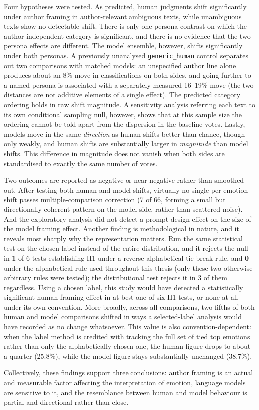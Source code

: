 Four hypotheses were tested. As predicted, human judgments shift significantly under
author framing in author-relevant ambiguous texts, while unambiguous texts show no detectable
shift. There is only one persona contrast on which the author-independent category is significant,
and there is no evidence that the two persona effects are different. The model ensemble, however,
shifts significantly under both personas. A previously unanalysed \texttt{generic\_human} control
separates
out two comparisons with matched models: an unspecified author line alone produces about an
8\% move in classifications on both sides, and going further to a named persona is associated
with a separately measured 16--19\% move (the two distances are not additive elements of a single
effect). The predicted category ordering holds in raw shift magnitude. A sensitivity analysis
referring each text to its own conditional sampling null, however, shows that at this sample size
the ordering cannot be told apart from the dispersion in the baseline votes. Lastly, models move
in the same \emph{direction} as human shifts better than chance, though only weakly, and human
shifts are substantially larger in \emph{magnitude} than model shifts. This difference in
magnitude does not vanish when both sides are standardised to exactly the same number of votes.

Two outcomes are reported as negative or near-negative rather than smoothed out. After testing
both human and model shifts, virtually no single per-emotion shift passes multiple-comparison
correction (7 of 66, forming a small but directionally coherent pattern on the model side, rather
than scattered noise). And the exploratory analysis did not detect a prompt-design effect on the size of the
model framing effect. Another finding is methodological in nature, and it reveals most sharply
why the representation matters. Run the same statistical test on the chosen label instead of the
entire distribution, and it rejects the null in \textbf{1} of 6 tests establishing H1 under a
reverse-alphabetical tie-break rule, and \textbf{0} under the alphabetical rule used throughout
this thesis (only these two otherwise-arbitrary rules were tested); the distributional test
rejects it in 3 of them regardless. Using a chosen label, this study would have detected a
statistically significant human framing effect in at best one of six H1 tests, or none at all
under its own convention. More broadly, across all comparisons, two fifths of both human and model
comparisons shifted in ways a selected-label analysis would have recorded as no change whatsoever.
This value is also convention-dependent: when the label method is credited with tracking the full
set of tied top emotions rather than only the alphabetically chosen one, the human figure drops to
about a quarter (25.8\%), while the model figure stays substantially unchanged (38.7\%).

Collectively, these findings support three conclusions: author framing is an actual and
measurable factor affecting the interpretation of emotion, language models are sensitive to it,
and the resemblance between human and model behaviour is partial and directional rather than
close.
